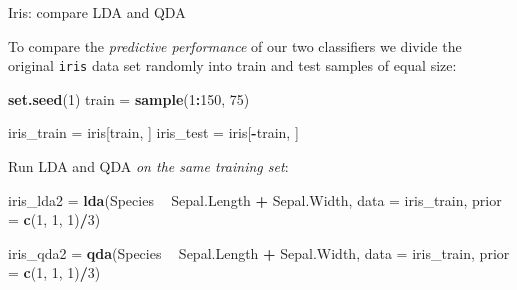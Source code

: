 \documentclass[10pt,ignorenonframetext,]{beamer}
\newenvironment{Shaded}{\begin{snugshade}}{\end{snugshade}}
\newcommand{\KeywordTok}[1]{\textcolor[rgb]{0.13,0.29,0.53}{\textbf{#1}}}
\newcommand{\DataTypeTok}[1]{\textcolor[rgb]{0.13,0.29,0.53}{#1}}
\newcommand{\DecValTok}[1]{\textcolor[rgb]{0.00,0.00,0.81}{#1}}
\newcommand{\StringTok}[1]{\textcolor[rgb]{0.31,0.60,0.02}{#1}}
\newcommand{\OperatorTok}[1]{\textcolor[rgb]{0.81,0.36,0.00}{\textbf{#1}}}
\newcommand{\NormalTok}[1]{#1}
\begin{document}
\begin{frame}[fragile]

\begin{block}{Iris: compare LDA and QDA}

\vspace{2mm}

To compare the \emph{predictive performance} of our two classifiers we
divide the original \texttt{iris} data set randomly into train and test
samples of equal size:

\scriptsize

\begin{Shaded}
\begin{Highlighting}[]
\KeywordTok{set.seed}\NormalTok{(}\DecValTok{1}\NormalTok{)}
\NormalTok{train =}\StringTok{ }\KeywordTok{sample}\NormalTok{(}\DecValTok{1}\OperatorTok{:}\DecValTok{150}\NormalTok{, }\DecValTok{75}\NormalTok{)}

\NormalTok{iris_train =}\StringTok{ }\NormalTok{iris[train, ]}
\NormalTok{iris_test =}\StringTok{ }\NormalTok{iris[}\OperatorTok{-}\NormalTok{train, ]}
\end{Highlighting}
\end{Shaded}

\normalsize

Run LDA and QDA \emph{on the same training set}:

\scriptsize

\begin{Shaded}
\begin{Highlighting}[]
\NormalTok{iris_lda2 =}\StringTok{ }\KeywordTok{lda}\NormalTok{(Species }\OperatorTok{~}\StringTok{ }\NormalTok{Sepal.Length }\OperatorTok{+}\StringTok{ }\NormalTok{Sepal.Width, }\DataTypeTok{data =}\NormalTok{ iris_train, }
    \DataTypeTok{prior =} \KeywordTok{c}\NormalTok{(}\DecValTok{1}\NormalTok{, }\DecValTok{1}\NormalTok{, }\DecValTok{1}\NormalTok{)}\OperatorTok{/}\DecValTok{3}\NormalTok{)}

\NormalTok{iris_qda2 =}\StringTok{ }\KeywordTok{qda}\NormalTok{(Species }\OperatorTok{~}\StringTok{ }\NormalTok{Sepal.Length }\OperatorTok{+}\StringTok{ }\NormalTok{Sepal.Width, }\DataTypeTok{data =}\NormalTok{ iris_train, }
    \DataTypeTok{prior =} \KeywordTok{c}\NormalTok{(}\DecValTok{1}\NormalTok{, }\DecValTok{1}\NormalTok{, }\DecValTok{1}\NormalTok{)}\OperatorTok{/}\DecValTok{3}\NormalTok{)}
\end{Highlighting}
\end{Shaded}

\end{block}

\end{frame}
\end{document}
